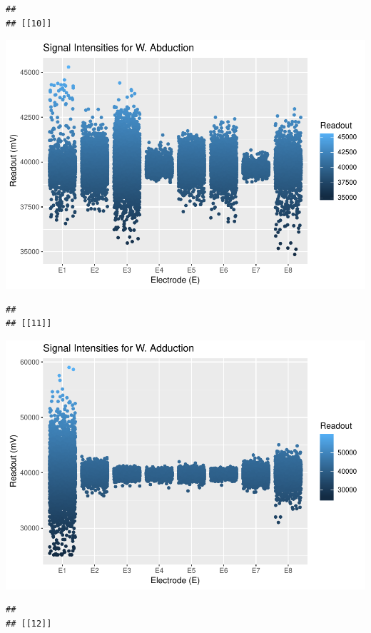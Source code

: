 \documentclass[]{article}
\begin{document}
\begin{verbatim}
## 
## [[10]]
\end{verbatim}

\includegraphics{Megahand_files/figure-latex/unnamed-chunk-6-10.pdf}

\begin{verbatim}
## 
## [[11]]
\end{verbatim}

\includegraphics{Megahand_files/figure-latex/unnamed-chunk-6-11.pdf}

\begin{verbatim}
## 
## [[12]]
\end{verbatim}
\end{document}
